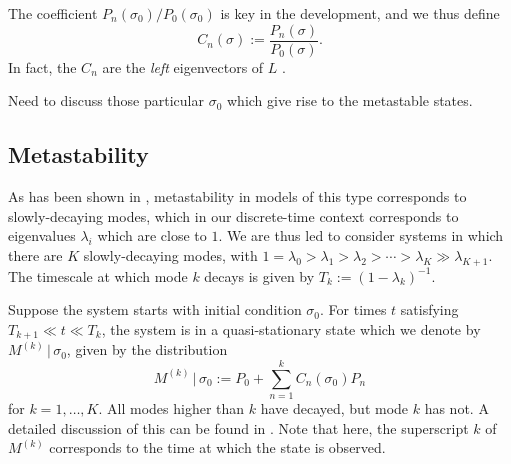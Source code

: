 \documentclass[10pt]{article}
\newcommand{\defeq}{:=}
\newcommand{\LL}{\mathsf{L}}
\newcommand{\Peq}{P_0}
\newcommand{\given}{\, | \,}
\newcommand{\M}[1]{M^{(#1)}}
\newcommand{\comment}[1]{{\color{red}#1}}
\begin{document}

The coefficient $P_n(\sigma_0) / \Peq(\sigma_0)$ is key in the development, and
we thus define
\begin{equation}
 C_n(\sigma) \defeq \frac{P_n(\sigma)}{\Peq(\sigma)}.
 \label{eq:defn-C_n}
\end{equation}
In fact, the $C_n$ are the \emph{left} eigenvectors of $L$
\cite{GaveauSchulmanJMP1998}.

\comment{Need to discuss those particular $\sigma_0$ which give rise to the
metastable states.}

\subsection{Metastability}

As has been shown in \cite{GaveauSchulmanJMP1998,LarraldeLeyvraz2005,
GaveauSchulmanMultiplePhasesPRE2006,
LarraldeLeyvrazSandersJStatMech2006},  metastability in models of this type
corresponds to slowly-decaying modes, which in our discrete-time context
corresponds to eigenvalues $\lambda_i$ which are close to $1$.
We are thus led to consider systems in which there are $K$ slowly-decaying
modes, with
$1 = \lambda_0 > \lambda_1 >
\lambda_2 > \cdots > \lambda_K \gg \lambda_{K+1}$.
% 
% 
The timescale at which mode $k$ decays is given by 
$T_k \defeq (1-\lambda_k)^{-1}$.

Suppose the system starts with initial condition $\sigma_0$.
For times $t$ satisfying  $T_{k+1} \ll t \ll T_k$, the system is in a
quasi-stationary state which we denote by $\M{k} \given \sigma_0$, given by the
distribution
\begin{equation}
 \M{k} \given \sigma_0 \defeq P_0 + \sum_{n=1}^k C_n(\sigma_0)
P_n
\end{equation}
for $k=1,\ldots,K$.  All modes higher than $k$ have decayed, but mode $k$ has
not.
A detailed discussion of this can be found in
\cite{LarraldeLeyvrazSandersJStatMech2006}.
Note that here, the superscript $k$ of $\M{k}$ corresponds to the time at which
the state is observed.
\end{document}
